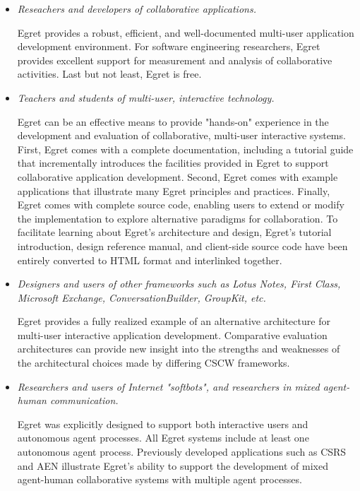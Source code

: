 \begin{itemize}
\item {\em Reseachers and developers of collaborative applications.}

  Egret provides a robust, efficient, and well-documented multi-user
  application development environment.  For software engineering
  researchers, Egret provides excellent support for measurement and
  analysis of collaborative activities.  Last but not least, Egret is
  free.

\item {\em Teachers and students of multi-user, interactive technology.}

  Egret can be an effective means to provide "hands-on" experience in the
  development and evaluation of collaborative, multi-user interactive
  systems.  First, Egret comes with a complete documentation, including a
  tutorial guide that incrementally introduces the facilities provided in
  Egret to support collaborative application development.  Second, Egret
  comes with example applications that illustrate many Egret principles and
  practices.  Finally, Egret comes with complete source code, enabling
  users to extend or modify the implementation to explore alternative
  paradigms for collaboration. To facilitate learning about Egret's
  architecture and design, Egret's tutorial introduction, design
  reference manual, and client-side source code have been entirely
  converted to HTML format and interlinked together.

\item {\em Designers and users of other frameworks such as Lotus Notes,
  First Class, Microsoft Exchange, ConversationBuilder, GroupKit, etc. }

  Egret provides a fully realized example of an alternative architecture
  for multi-user interactive application development. Comparative
  evaluation architectures can provide new insight into the strengths and
  weaknesses of the architectural choices made by differing CSCW
  frameworks.

\item {\em Researchers and users of Internet "softbots", and researchers
  in mixed agent-human communication.}

  Egret was explicitly designed to support both interactive users and
  autonomous agent processes.  All Egret systems include at least one
  autonomous agent process.  Previously developed applications such
  as CSRS and AEN illustrate Egret's ability to support the
  development of mixed agent-human collaborative systems with
  multiple agent processes.

\end{itemize}



